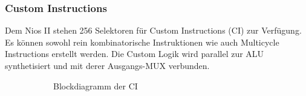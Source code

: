 \subsubsection{Custom Instructions}
Dem Nios II stehen 256 Selektoren für Custom Instructions (CI) zur Verfügung. Es können sowohl rein kombinatorische Instruktionen wie auch Multicycle Instructions erstellt werden. Die Custom Logik wird parallel zur ALU synthetisiert und mit derer Ausgangs-MUX verbunden.
\newpage
\begin{figure}[ht!]
\centering
{}
\begin{subfigure}[b]{0.4\textwidth}
    \centering
    \usebox{\largestimage}
\caption{Blockdiagramm  der CI}
 \end{subfigure}
 \begin{subfigure}[b]{0.4\textwidth}
 \centering
    \raisebox{\dimexpr.5\ht\largestimage-.5\height}{%
}
\end{subfigure}
\end{figure}
